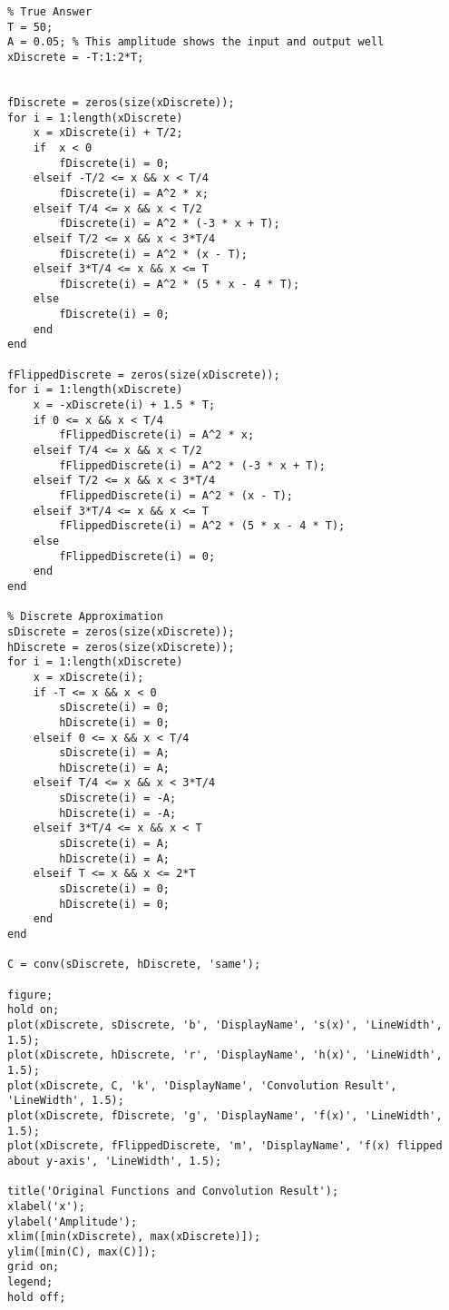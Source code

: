 \documentclass[11pt]{article}
\begin{document}
\begin{verbatim}
% True Answer
T = 50;
A = 0.05; % This amplitude shows the input and output well
xDiscrete = -T:1:2*T;


fDiscrete = zeros(size(xDiscrete));
for i = 1:length(xDiscrete)
    x = xDiscrete(i) + T/2;
    if  x < 0
        fDiscrete(i) = 0;
    elseif -T/2 <= x && x < T/4
        fDiscrete(i) = A^2 * x;
    elseif T/4 <= x && x < T/2
        fDiscrete(i) = A^2 * (-3 * x + T);
    elseif T/2 <= x && x < 3*T/4
        fDiscrete(i) = A^2 * (x - T);
    elseif 3*T/4 <= x && x <= T
        fDiscrete(i) = A^2 * (5 * x - 4 * T);
    else
        fDiscrete(i) = 0;
    end
end

fFlippedDiscrete = zeros(size(xDiscrete));
for i = 1:length(xDiscrete)
    x = -xDiscrete(i) + 1.5 * T;
    if 0 <= x && x < T/4
        fFlippedDiscrete(i) = A^2 * x;
    elseif T/4 <= x && x < T/2
        fFlippedDiscrete(i) = A^2 * (-3 * x + T);
    elseif T/2 <= x && x < 3*T/4
        fFlippedDiscrete(i) = A^2 * (x - T);
    elseif 3*T/4 <= x && x <= T
        fFlippedDiscrete(i) = A^2 * (5 * x - 4 * T);
    else
        fFlippedDiscrete(i) = 0;
    end
end

% Discrete Approximation
sDiscrete = zeros(size(xDiscrete));
hDiscrete = zeros(size(xDiscrete));
for i = 1:length(xDiscrete)
    x = xDiscrete(i);
    if -T <= x && x < 0
        sDiscrete(i) = 0;
        hDiscrete(i) = 0;
    elseif 0 <= x && x < T/4
        sDiscrete(i) = A;
        hDiscrete(i) = A;
    elseif T/4 <= x && x < 3*T/4
        sDiscrete(i) = -A;
        hDiscrete(i) = -A;
    elseif 3*T/4 <= x && x < T
        sDiscrete(i) = A;
        hDiscrete(i) = A;
    elseif T <= x && x <= 2*T
        sDiscrete(i) = 0;
        hDiscrete(i) = 0;
    end
end

C = conv(sDiscrete, hDiscrete, 'same');

figure;
hold on;
plot(xDiscrete, sDiscrete, 'b', 'DisplayName', 's(x)', 'LineWidth', 1.5);
plot(xDiscrete, hDiscrete, 'r', 'DisplayName', 'h(x)', 'LineWidth', 1.5);
plot(xDiscrete, C, 'k', 'DisplayName', 'Convolution Result', 'LineWidth', 1.5);
plot(xDiscrete, fDiscrete, 'g', 'DisplayName', 'f(x)', 'LineWidth', 1.5);
plot(xDiscrete, fFlippedDiscrete, 'm', 'DisplayName', 'f(x) flipped about y-axis', 'LineWidth', 1.5);

title('Original Functions and Convolution Result');
xlabel('x');
ylabel('Amplitude');
xlim([min(xDiscrete), max(xDiscrete)]);
ylim([min(C), max(C)]);
grid on;
legend;
hold off;
\end{verbatim}
\end{document}
